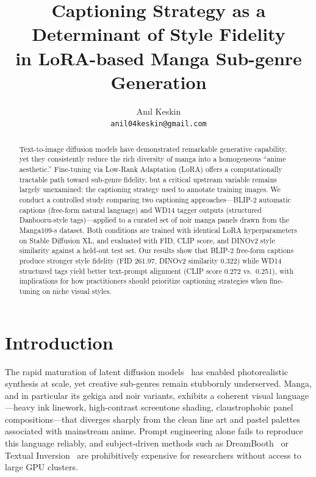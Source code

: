 \documentclass[10pt,twocolumn,letterpaper]{article}
\begin{document}
\title{Captioning Strategy as a Determinant of Style Fidelity\\
in LoRA-based Manga Sub-genre Generation}

\author{An{\i}l Keskin\\
{\tt\small anil04keskin@gmail.com}
}

\maketitle

\begin{abstract}
Text-to-image diffusion models have demonstrated remarkable generative capability, yet they consistently reduce the rich diversity of manga into a homogeneous ``anime aesthetic.''
Fine-tuning via Low-Rank Adaptation (LoRA) offers a computationally tractable path toward sub-genre fidelity, but a critical upstream variable remains largely unexamined: the captioning strategy used to annotate training images.
We conduct a controlled study comparing two captioning approaches—BLIP-2 automatic captions (free-form natural language) and WD14 tagger outputs (structured Danbooru-style tags)—applied to a curated set of noir manga panels drawn from the Manga109-s dataset.
Both conditions are trained with identical LoRA hyperparameters on Stable Diffusion XL, and evaluated with FID, CLIP score, and DINOv2 style similarity against a held-out test set.
Our results show that BLIP-2 free-form captions produce stronger style fidelity (FID 261.97, DINOv2 similarity 0.322) while WD14 structured tags yield better text-prompt alignment (CLIP score 0.272 vs.\ 0.251), with implications for how practitioners should prioritize captioning strategies when fine-tuning on niche visual styles.
\end{abstract}

\section{Introduction}

The rapid maturation of latent diffusion models~\cite{rombach2022ldm,podell2023sdxl} has enabled photorealistic synthesis at scale, yet creative sub-genres remain stubbornly underserved.
Manga, and in particular its gekiga and noir variants, exhibits a coherent visual language—heavy ink linework, high-contrast screentone shading, claustrophobic panel compositions—that diverges sharply from the clean line art and pastel palettes associated with mainstream anime.
Prompt engineering alone fails to reproduce this language reliably, and subject-driven methods such as DreamBooth~\cite{ruiz2023dreambooth} or Textual Inversion~\cite{gal2022textual} are prohibitively expensive for researchers without access to large GPU clusters.
\end{document}

